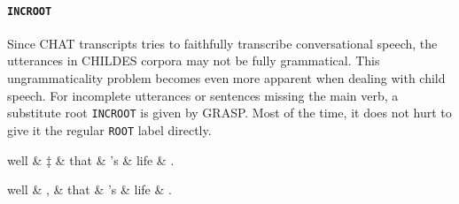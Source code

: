 \paragraph{\texttt{INCROOT}}
Since CHAT transcripts tries to faithfully transcribe conversational speech, the utterances in CHILDES corpora may not be fully grammatical. This ungrammaticality problem becomes even more apparent when dealing with child speech. For incomplete utterances or sentences missing the main verb, a substitute root \texttt{INCROOT} is given by GRASP. Most of the time, it does not hurt to give it the regular \texttt{ROOT} label directly.
\clearpage

\begin{minipage}{\widefigurewidth}
\begin{dependency}[edge slant=3pt]
	\begin{deptext}[column sep=0.7cm]
	well \& ‡ \& that \& 's \& life \& .\\
	\end{deptext}
\end{dependency}
\hfill
\begin{dependency}[edge slant=3pt]
	\begin{deptext}[column sep=0.7cm]
	well \& , \& that \& 's \& life \& .\\
	\end{deptext}
\end{dependency}
\end{minipage}
\label{fig:intj}

